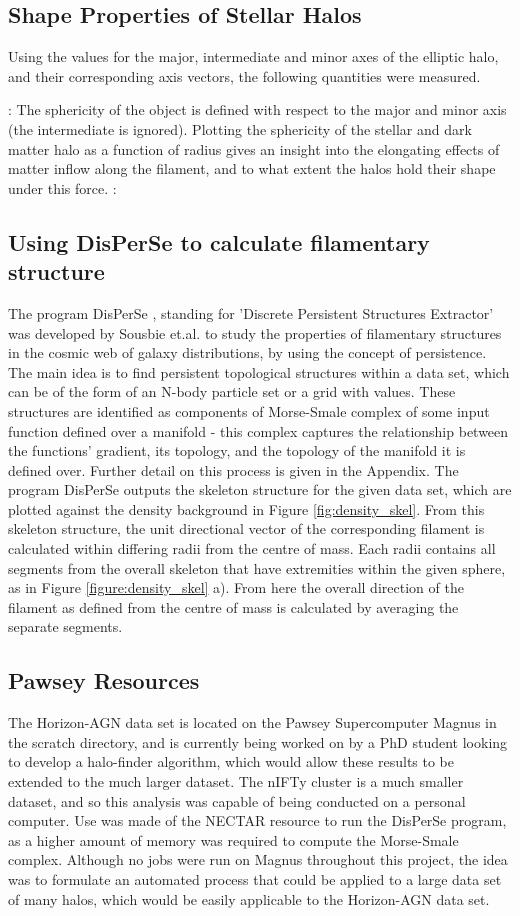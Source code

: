 \documentclass[journal]{IEEEtran}
\begin{document}
\subsection{Shape Properties of Stellar Halos}
Using the values for the major, intermediate and minor axes of the elliptic halo, and their corresponding axis vectors, the following quantities were measured. 

: The sphericity of the object is defined with respect to the major and minor axis (the intermediate is ignored). Plotting the sphericity of the stellar and dark matter halo as a function of radius gives an insight into the elongating effects of matter inflow along the filament, and to what extent the halos hold their shape under this force. 
:
\IEEEPARstart{}{}
\subsection{Using DisPerSe to calculate filamentary structure}
The program DisPerSe \cite{sousbie11a}, standing for 'Discrete Persistent Structures Extractor' was developed by Sousbie et.al. to study the properties of filamentary structures in the cosmic web of galaxy distributions, by using the concept of persistence. The main idea is to find persistent topological structures within a data set, which can be of the form of an N-body particle set or a grid with values. These structures are identified as components of Morse-Smale complex of some input function defined over a manifold - this complex captures the relationship between the functions' gradient, its topology, and the topology of the manifold it is defined over. Further detail on this process is given in the Appendix.
The program DisPerSe outputs the skeleton structure for the given data set, which are plotted against the density background in Figure \ref{fig:density_skel}. From this skeleton structure, the unit directional vector of the corresponding filament is calculated within differing radii from the centre of mass. Each radii contains all segments from the overall skeleton that have extremities within the given sphere, as in Figure \ref{figure:density_skel} a). From here the overall direction of the filament as defined from the centre of mass is calculated by averaging the separate segments.
\subsection{Pawsey Resources}
The Horizon-AGN data set is located on the Pawsey Supercomputer Magnus in the scratch directory, and is currently being worked on by a PhD student looking to develop a halo-finder algorithm, which would allow these results to be extended to the much larger dataset. The nIFTy cluster is a much smaller dataset, and so this analysis was capable of being conducted on a personal computer. Use was made of the NECTAR resource to run the DisPerSe program, as a higher amount of memory was required to compute the Morse-Smale complex. Although no jobs were run on Magnus throughout this project, the idea was to formulate an automated process that could be applied to a large data set of many halos, which would be easily applicable to the Horizon-AGN data set. 
\end{document}
